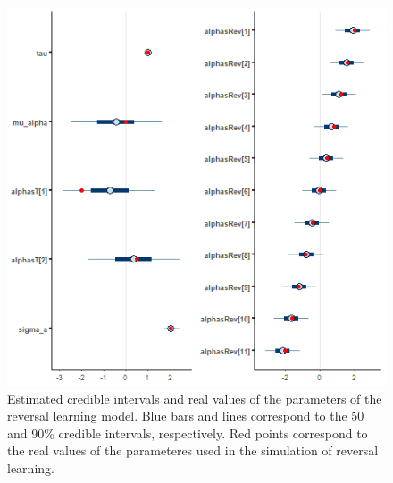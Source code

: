\documentclass[
]{article}
\begin{document}
\begin{figure}

\includegraphics[width=6.67in,]{images/sim_mcmc_interv_rev} \hfill{}

\caption{Estimated credible intervals and real values of the parameters of the reversal learning model. Blue bars and lines correspond to the 50 and 90\% credible intervals, respectively. Red points correspond to the real values of the parameteres used in the simulation of reversal learning. }\label{fig:rev_sim_interv_block}
\end{figure}
\end{document}
